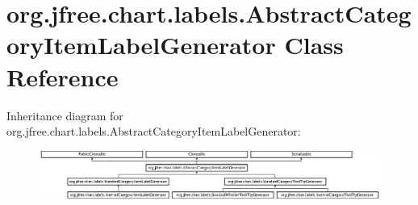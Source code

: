 \hypertarget{classorg_1_1jfree_1_1chart_1_1labels_1_1_abstract_category_item_label_generator}{}\section{org.\+jfree.\+chart.\+labels.\+Abstract\+Category\+Item\+Label\+Generator Class Reference}
\label{classorg_1_1jfree_1_1chart_1_1labels_1_1_abstract_category_item_label_generator}
Inheritance diagram for org.\+jfree.\+chart.\+labels.\+Abstract\+Category\+Item\+Label\+Generator\+:\begin{figure}[H]
\begin{center}
\leavevmode
\includegraphics[height=1.573034cm]{classorg_1_1jfree_1_1chart_1_1labels_1_1_abstract_category_item_label_generator}
\end{center}
\end{figure}
